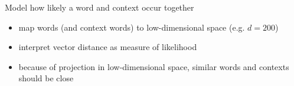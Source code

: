 Model how likely a word and context occur together
\begin{itemize}
  \item map words (and context words) to low-dimensional space (e.g. $d = 200$)
  \item interpret vector distance as measure of likelihood
  \item because of projection in low-dimensional space, similar words and contexts should be close
\end{itemize}
